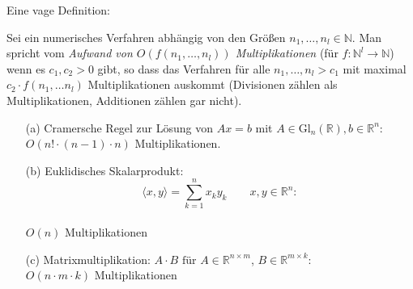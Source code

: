 \documentclass[11pt]{scrartcl}
\newcommand*{\NN}{\mathbb N}
\newcommand*{\RR}{\mathbb R}
\newcommand*{\Gl}{\mathrm{Gl}}
\theoremstyle{break}
\theoremstyle{remark}
\begin{document}
Eine vage Definition:

\begin{Definition}[Aufwand]
Sei ein numerisches Verfahren abhängig von den Größen $n_1, \ldots, n_l \in \NN$.
Man spricht vom 
\emph{Aufwand von $O(f(n_1, \dots, n_l))$ Multiplikationen}
(für $f\colon \mathbb{N}^l \to \mathbb{N}$) wenn es 
$c_1, c_2 > 0$ gibt, so dass das Verfahren für alle 
$n_1, \dots, n_l > c_1$ mit maximal $c_2 \cdot f(n_1, \dots n_l)$
Multiplikationen auskommt (Divisionen zählen als Multiplikationen, 
Additionen zählen gar nicht). 
\end{Definition}

\begin{Beispiel}
\begin{enumerate}
\item[(a)]
Cramersche Regel zur Lösung von $Ax = b$ mit $A \in \Gl_n(\RR), 
b \in \mathbb{R}^n$: \\
$O(n! \cdot (n-1)\cdot n)$ Multiplikationen.
\item[(b)]
Euklidisches Skalarprodukt:
$$\langle x,y \rangle = \sum_{k=1}^n x_k y_k \qquad x,y \in \mathbb{R}^n:$$ \\
$O(n)$ Multiplikationen
\item[(c)]
Matrixmultiplikation: $A \cdot B \text{ für } A\in 
\mathbb{R}^{n \times m}$, $B \in \mathbb{R}^{m \times k}$: \\
$O(n \cdot m \cdot k ) $ Multiplikationen
\end{enumerate} 
\end{Beispiel} 
\end{document}
